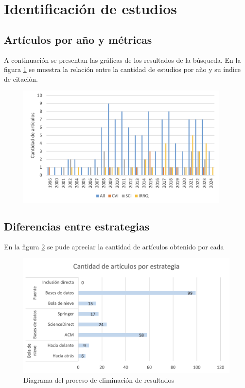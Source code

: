 \section{Identificación de estudios}

\subsection{Artículos por año y métricas}
\noindent
A continuación se presentan las gráficas de los resultados de la búsqueda. En la figura \ref{fig:plot-anios-vs-indices-calidad} se muestra la relación entre la cantidad de estudios por año y su índice de citación.

\begin{figure}[H]
	\begin{center}
		\includegraphics[width=0.95\textwidth]{tablas-images/sms/plot-freq-indices.png}
	\end{center}
	\caption{}\label{fig:plot-anios-vs-indices-calidad}
\end{figure}



\subsection{Diferencias entre estrategias}

En la figura \ref{fig:plot-estrategia_vs_articulos} se pude apreciar la cantidad de artículos obtenido por cada

\begin{figure}[H]
	\centering
	\includegraphics[scale=0.9] {tablas-images/sms/plot-estrategia_vs_articulos.png}
	\caption{Diagrama del proceso de eliminación de resultados}\label{fig:plot-estrategia_vs_articulos}
\end{figure}

